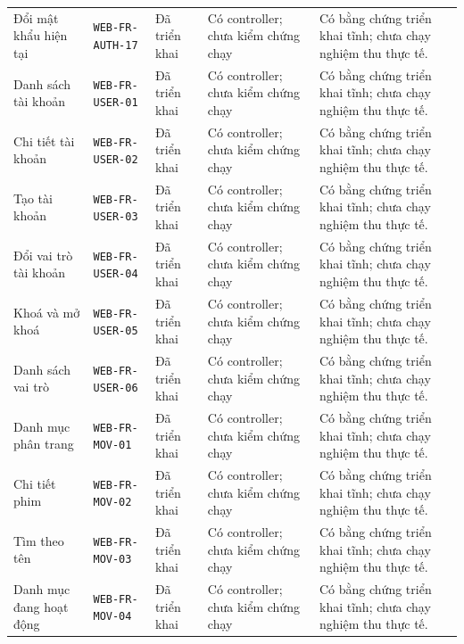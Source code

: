 \begin{longtable}{@{}P{0.19000\SRSWidth}P{0.18000\SRSWidth}P{0.15000\SRSWidth}P{0.20000\SRSWidth}P{0.28000\SRSWidth}@{}}
Đổi mật khẩu hiện tại & \texttt{WEB-\allowbreak{}FR-\allowbreak{}AUTH-\allowbreak{}17} & Đã triển khai & Có controller; chưa kiểm chứng chạy & Có bằng chứng triển khai tĩnh; chưa chạy nghiệm thu thực tế. \\[3pt]
Danh sách tài khoản & \texttt{WEB-\allowbreak{}FR-\allowbreak{}USER-\allowbreak{}01} & Đã triển khai & Có controller; chưa kiểm chứng chạy & Có bằng chứng triển khai tĩnh; chưa chạy nghiệm thu thực tế. \\[3pt]
Chi tiết tài khoản & \texttt{WEB-\allowbreak{}FR-\allowbreak{}USER-\allowbreak{}02} & Đã triển khai & Có controller; chưa kiểm chứng chạy & Có bằng chứng triển khai tĩnh; chưa chạy nghiệm thu thực tế. \\[3pt]
Tạo tài khoản & \texttt{WEB-\allowbreak{}FR-\allowbreak{}USER-\allowbreak{}03} & Đã triển khai & Có controller; chưa kiểm chứng chạy & Có bằng chứng triển khai tĩnh; chưa chạy nghiệm thu thực tế. \\[3pt]
Đổi vai trò tài khoản & \texttt{WEB-\allowbreak{}FR-\allowbreak{}USER-\allowbreak{}04} & Đã triển khai & Có controller; chưa kiểm chứng chạy & Có bằng chứng triển khai tĩnh; chưa chạy nghiệm thu thực tế. \\[3pt]
Khoá và mở khoá & \texttt{WEB-\allowbreak{}FR-\allowbreak{}USER-\allowbreak{}05} & Đã triển khai & Có controller; chưa kiểm chứng chạy & Có bằng chứng triển khai tĩnh; chưa chạy nghiệm thu thực tế. \\[3pt]
Danh sách vai trò & \texttt{WEB-\allowbreak{}FR-\allowbreak{}USER-\allowbreak{}06} & Đã triển khai & Có controller; chưa kiểm chứng chạy & Có bằng chứng triển khai tĩnh; chưa chạy nghiệm thu thực tế. \\[3pt]
Danh mục phân trang & \texttt{WEB-\allowbreak{}FR-\allowbreak{}MOV-\allowbreak{}01} & Đã triển khai & Có controller; chưa kiểm chứng chạy & Có bằng chứng triển khai tĩnh; chưa chạy nghiệm thu thực tế. \\[3pt]
Chi tiết phim & \texttt{WEB-\allowbreak{}FR-\allowbreak{}MOV-\allowbreak{}02} & Đã triển khai & Có controller; chưa kiểm chứng chạy & Có bằng chứng triển khai tĩnh; chưa chạy nghiệm thu thực tế. \\[3pt]
Tìm theo tên & \texttt{WEB-\allowbreak{}FR-\allowbreak{}MOV-\allowbreak{}03} & Đã triển khai & Có controller; chưa kiểm chứng chạy & Có bằng chứng triển khai tĩnh; chưa chạy nghiệm thu thực tế. \\[3pt]
Danh mục đang hoạt động & \texttt{WEB-\allowbreak{}FR-\allowbreak{}MOV-\allowbreak{}04} & Đã triển khai & Có controller; chưa kiểm chứng chạy & Có bằng chứng triển khai tĩnh; chưa chạy nghiệm thu thực tế. \\[3pt]

\end{longtable}
